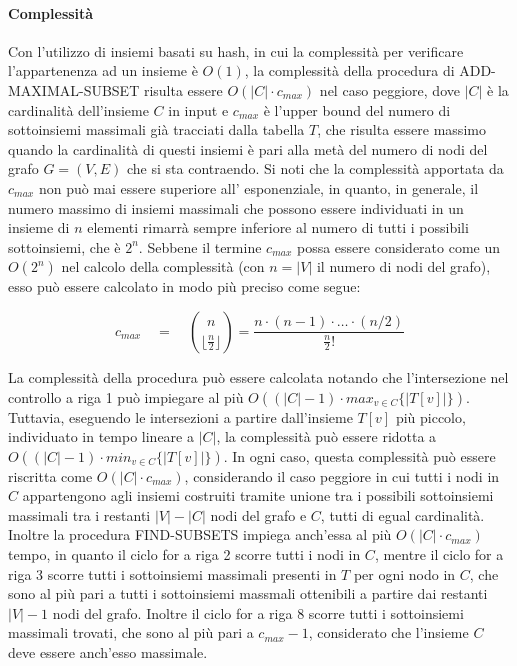 \paragraph{Complessit\`a}
Con l'utilizzo di insiemi basati su hash, in cui la complessit\`a per verificare l'appartenenza ad un insieme \`e
$O(1)$, la complessit\`a della procedura di ADD-MAXIMAL-SUBSET risulta essere $O(|C| \cdot c_{max})$ nel caso peggiore,
dove $|C|$ \`e la cardinalit\`a dell'insieme $C$ in input e $c_{max}$ \`e l'upper bound del numero di sottoinsiemi
massimali già tracciati dalla tabella $T$, che risulta essere massimo quando la cardinalit\`a di questi insiemi
\`e pari alla met\`a del numero di nodi del grafo $G = (V, E)$ che si sta contraendo.
Si noti che la complessit\`a apportata da $c_{max}$ non pu\`o mai essere
superiore all' esponenziale, in quanto, in generale, il numero massimo di insiemi massimali che possono essere
individuati in un insieme di $n$ elementi rimarr\`a sempre inferiore al numero di tutti i possibili sottoinsiemi,
che è $2^n$.
Sebbene il termine $c_{max}$ possa essere considerato come un $O(2^n)$ nel calcolo della complessit\`a (con $n = |V|$
il numero di nodi del grafo), esso pu\`o essere calcolato in modo pi\`u preciso come segue:

\begin{equation*}
    c_{max} \quad = \quad \binom{n}{\lfloor \frac{n}{2} \rfloor} = \frac{n\cdot(n-1)\cdot\ldots\cdot(n/2)}{\frac{n}{2}!}
\end{equation*}

La complessit\`a della procedura pu\`o essere calcolata notando che l'intersezione nel controllo a riga 1 pu\`o
impiegare al pi\`u $O((|C|-1) \cdot max_{v \in C}\{|T[v]|\})$.
Tuttavia, eseguendo le intersezioni a partire dall'insieme $T[v]$ pi\`u piccolo, individuato in tempo lineare a
$|C|$, la complessit\`a pu\`o essere ridotta a $O((|C|-1) \cdot min_{v \in C}\{|T[v]|\})$.
In ogni caso, questa complessit\`a pu\`o essere riscritta come $O(|C| \cdot c_{max})$, considerando il caso peggiore
in cui tutti i nodi in $C$ appartengono agli insiemi costruiti tramite unione tra i possibili sottoinsiemi massimali
tra i restanti $|V|-|C|$ nodi del grafo e $C$, tutti di egual cardinalit\`a.
Inoltre la procedura FIND-SUBSETS impiega anch'essa al pi\`u $O(|C| \cdot c_{max})$ tempo,
in quanto il ciclo for a riga 2 scorre tutti i nodi in $C$, mentre il ciclo for a riga 3 scorre tutti i
sottoinsiemi massimali presenti in $T$ per ogni nodo in $C$, che sono al pi\`u pari a tutti i sottoinsiemi massmali
ottenibili a partire dai restanti $|V|-1$ nodi del grafo.
Inoltre il ciclo for a riga 8 scorre tutti i sottoinsiemi massimali trovati, che sono al pi\`u pari a $c_{max} - 1$,
considerato che l'insieme $C$ deve essere anch'esso massimale.

